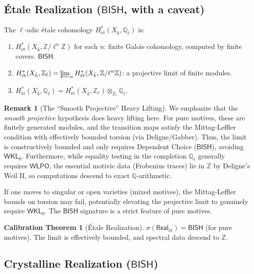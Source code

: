 \documentclass[11pt,a4paper]{article}
\theoremstyle{plain}
\theoremstyle{definition}
\newtheorem{remark}[theorem]{Remark}
\newtheorem{calibration}[theorem]{Calibration Theorem}
\newcommand{\BISH}{\textsf{BISH}}
\newcommand{\WKL}{\textsf{WKL}_0}
\newcommand{\WLPO}{\textsf{WLPO}}
\newcommand{\Real}{\mathsf{Real}}
\newcommand{\sig}{\sigma}
\newcommand{\Z}{\mathbb{Z}}
\newcommand{\Q}{\mathbb{Q}}
\begin{document}
\subsection{\'Etale Realization ($\BISH$, with a caveat)}\label{sec:etale}

The $\ell$-adic \'etale cohomology $H^*_{\mathrm{\acute{e}t}}(X_{\bar{k}}, \Q_\ell)$ is:

\begin{enumerate}[label=(\alph*)]
\item $H^*_{\mathrm{\acute{e}t}}(X_{\bar{k}}, \Z/\ell^n\Z)$ for each $n$: finite Galois cohomology, computed by finite covers. $\BISH$.
\item $H^*_{\mathrm{\acute{e}t}}(X_{\bar{k}}, \Z_\ell) = \varprojlim_n H^*_{\mathrm{\acute{e}t}}(X_{\bar{k}}, \Z/\ell^n\Z)$: a projective limit of finite modules. 
\item $H^*_{\mathrm{\acute{e}t}}(X_{\bar{k}}, \Q_\ell) = H^*_{\mathrm{\acute{e}t}}(X_{\bar{k}}, \Z_\ell) \otimes_{\Z_\ell} \Q_\ell$. 
\end{enumerate}

\begin{remark}[The ``Smooth Projective'' Heavy Lifting]\label{rmk:smooth-projective}
We emphasize that the \emph{smooth projective} hypothesis does heavy lifting here. For pure motives, these are finitely generated modules, and the transition maps satisfy the Mittag-Leffler condition with effectively bounded torsion (via Deligne/Gabber). Thus, the limit is constructively bounded and only requires Dependent Choice ($\BISH$), avoiding $\WKL$. Furthermore, while equality testing in the completion $\Q_\ell$ generally requires $\WLPO$, the essential motivic data (Frobenius traces) lie in $\Z$ by Deligne's Weil II, so computations descend to exact $\Q$-arithmetic.

If one moves to singular or open varieties (mixed motives), the Mittag-Leffler bounds on torsion may fail, potentially elevating the projective limit to genuinely require $\WKL$. The $\BISH$ signature is a strict feature of pure motives.
\end{remark}

\begin{calibration}[\'Etale Realization]\label{cal:etale}
$\sig(\Real_{\mathrm{\acute{e}t}}) = \BISH$ (for pure motives). The limit is effectively bounded, and spectral data descend to $\Z$.
\end{calibration}

\subsection{Crystalline Realization ($\BISH$)}
\end{document}
